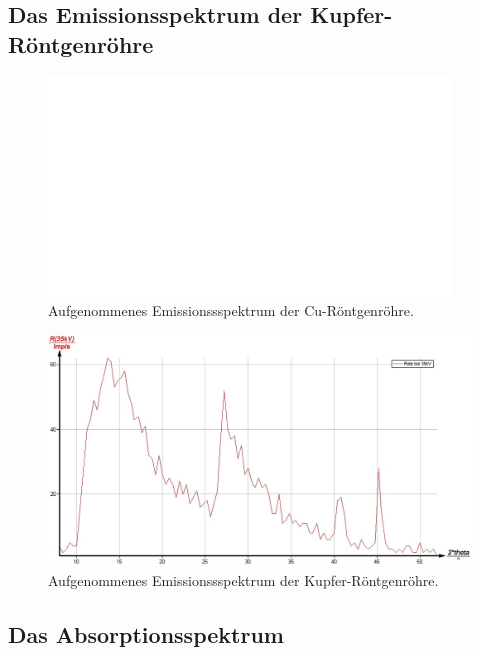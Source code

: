 \FloatBarrier
\subsection{Das Emissionsspektrum der Kupfer-Röntgenröhre}
\begin{figure}
	\includegraphics[width=0.95\textwidth]{nIKO_und_jULIAN_ÜLADS/Kupferemission.png}
	\caption{Aufgenommenes Emissionssspektrum der Cu-Röntgenröhre.}
	\label{fig:kupfer}
\end{figure}
\begin{figure}
	\includegraphics[width=1.0\textwidth]{nIKO_und_jULIAN_ÜLADS/Kupfaemmision.jpg}
	\caption{Aufgenommenes Emissionssspektrum der Kupfer-Röntgenröhre.}
	\label{fig:emissionlol}
\end{figure}




\FloatBarrier
\subsection{Das Absorptionsspektrum}

